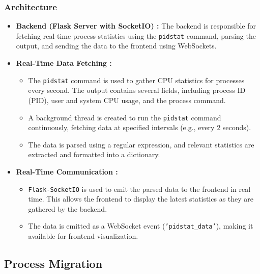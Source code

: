 \documentclass[12pt]{article}
\begin{document}
\subsubsection{Architecture}

\begin{itemize}
\item {\bf Backend (Flask Server with SocketIO) :}
The backend is responsible for fetching real-time process statistics using the \texttt{pidstat} command, parsing the output, and sending the data to the frontend using WebSockets.

\item{\bf Real-Time Data Fetching :}
\begin{itemize}
    \item The \texttt{pidstat} command is used to gather CPU statistics for processes every second. The output contains several fields, including process ID (PID), user and system CPU usage, and the process command.
    \item A background thread is created to run the \texttt{pidstat} command continuously, fetching data at specified intervals (e.g., every 2 seconds).
    \item The data is parsed using a regular expression, and relevant statistics are extracted and formatted into a dictionary.
\end{itemize}

\item{\bf Real-Time Communication :}
\begin{itemize}
    \item \texttt{Flask-SocketIO} is used to emit the parsed data to the frontend in real time. This allows the frontend to display the latest statistics as they are gathered by the backend.
    \item The data is emitted as a WebSocket event (\texttt{'pidstat\_data'}), making it available for frontend visualization.
\end{itemize}
\end{itemize}
\subsection{Process Migration}
\end{document}
